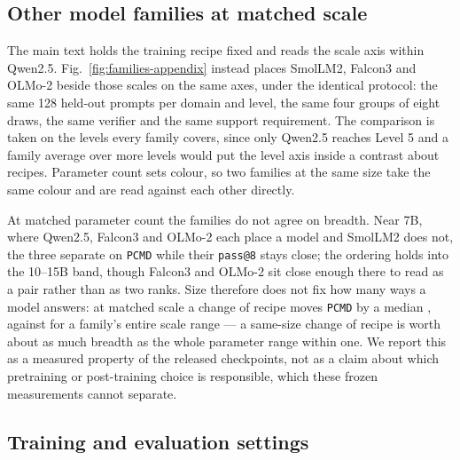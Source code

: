 \documentclass{article}
\newcommand{\1}{\mathbf 1}
\newcommand{\pmd}{\texttt{PCMD}}
\theoremstyle{remark}
\theoremstyle{definition}
\theoremstyle{plain}
\begin{document}
\subsection{Other model families at matched scale}
\label{sec:families-appendix}

The main text holds the training recipe fixed and reads the scale axis within
Qwen2.5. Fig.~\ref{fig:families-appendix} instead places SmolLM2, Falcon3 and
OLMo-2 beside those scales on the same axes, under the identical protocol: the
same 128 held-out prompts per domain and level, the same four groups of eight
draws, the same verifier and the same support requirement. The comparison is
taken on the \MDcommonlevels{} levels every family covers, since only Qwen2.5
reaches Level 5 and a family average over more levels would put the level
axis inside a contrast about recipes. Parameter count sets
colour, so two families at the same size take the same colour and are read
against each other directly.

At matched parameter count the families do not agree on breadth. Near 7B,
where Qwen2.5, Falcon3 and OLMo-2 each place a model and SmolLM2 does not, the
three separate on \pmd{} while their \texttt{pass@8} stays close; the ordering
holds into the 10--15B band, though Falcon3 and OLMo-2 sit close enough there to
read as a pair rather than as two ranks. Size therefore does not fix how
many ways a model answers: at matched scale a change of recipe moves \pmd{} by a
median \MDrecipespan{}, against \MDwithinrecipespan{} for a family's entire
scale range --- a same-size change of recipe is worth about as much breadth as
the whole parameter range within one. We report this as a measured property
of the released checkpoints, not as a claim about which pretraining or
post-training choice is responsible, which these frozen measurements cannot
separate.


\subsection{Training and evaluation settings}
\label{app:repro-run-contract}
\label{app:comparison-design}
\end{document}
